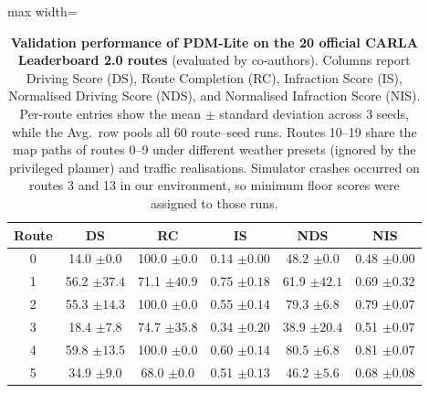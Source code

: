 \begin{table}[!tp]
  \centering
  \caption[PDM-Lite on the official CARLA validation routes]{\textbf{Validation performance of PDM-Lite on the 20 official CARLA Leaderboard 2.0 routes} (evaluated by co-authors). Columns report Driving Score (DS), Route Completion (RC), Infraction Score (IS), Normalised Driving Score (NDS), and Normalised Infraction Score (NIS). Per-route entries show the mean $\pm$ standard deviation across 3 seeds, while the Avg.\ row pools all 60 route--seed runs. Routes 10--19 share the map paths of routes 0--9 under different weather presets (ignored by the privileged planner) and traffic realisations. Simulator crashes occurred on routes 3 and 13 in our environment, so minimum floor scores were assigned to those runs.}
  \label{drivelm:tab:pdm_results}
  \small
  \begin{adjustbox}{max width=\textwidth}
  \begin{tabular}{c|c|c|c|c|c}
    \toprule
    \textbf{Route} & \textbf{DS} & \textbf{RC} & \textbf{IS} & \textbf{NDS} & \textbf{NIS} \\
    \midrule
    0 & 14.0 {\color{gray}\footnotesize $\pm 0.0$} & 100.0 {\color{gray}\footnotesize $\pm 0.0$} & 0.14 {\color{gray}\footnotesize $\pm 0.00$} & 48.2 {\color{gray}\footnotesize $\pm 0.0$} & 0.48 {\color{gray}\footnotesize $\pm 0.00$} \\
    1 & 56.2 {\color{gray}\footnotesize $\pm 37.4$} & 71.1 {\color{gray}\footnotesize $\pm 40.9$} & 0.75 {\color{gray}\footnotesize $\pm 0.18$} & 61.9 {\color{gray}\footnotesize $\pm 42.1$} & 0.69 {\color{gray}\footnotesize $\pm 0.32$} \\
    2 & 55.3 {\color{gray}\footnotesize $\pm 14.3$} & 100.0 {\color{gray}\footnotesize $\pm 0.0$} & 0.55 {\color{gray}\footnotesize $\pm 0.14$} & 79.3 {\color{gray}\footnotesize $\pm 6.8$} & 0.79 {\color{gray}\footnotesize $\pm 0.07$} \\
    3 & 18.4 {\color{gray}\footnotesize $\pm 7.8$} & 74.7 {\color{gray}\footnotesize $\pm 35.8$} & 0.34 {\color{gray}\footnotesize $\pm 0.20$} & 38.9 {\color{gray}\footnotesize $\pm 20.4$} & 0.51 {\color{gray}\footnotesize $\pm 0.07$} \\
    4 & 59.8 {\color{gray}\footnotesize $\pm 13.5$} & 100.0 {\color{gray}\footnotesize $\pm 0.0$} & 0.60 {\color{gray}\footnotesize $\pm 0.14$} & 80.5 {\color{gray}\footnotesize $\pm 6.8$} & 0.81 {\color{gray}\footnotesize $\pm 0.07$} \\
    5 & 34.9 {\color{gray}\footnotesize $\pm 9.0$} & 68.0 {\color{gray}\footnotesize $\pm 0.0$} & 0.51 {\color{gray}\footnotesize $\pm 0.13$} & 46.2 {\color{gray}\footnotesize $\pm 5.6$} & 0.68 {\color{gray}\footnotesize $\pm 0.08$} \\

\end{tabular}
\end{adjustbox}
\end{table}
